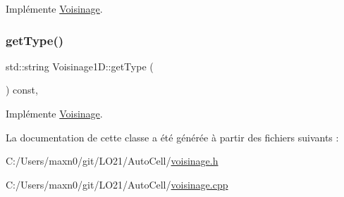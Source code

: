 Implémente \mbox{\hyperlink{class_voisinage_ac12f70bf8e971cbc8eaf8394de270d07}{Voisinage}}.

\mbox{\label{class_voisinage1_d_a92cc6dea76b6426d3cdaf849d18d205c}} 
\subsubsection{\texorpdfstring{get\+Type()}{getType()}}
{\footnotesize\ttfamily std\+::string Voisinage1\+D\+::get\+Type (\begin{DoxyParamCaption}{ }\end{DoxyParamCaption}) const\hspace{0.3cm}{\ttfamily [inline]}, {\ttfamily [virtual]}}



Implémente \mbox{\hyperlink{class_voisinage_a9853dfde1a68f5bb6333a8db001411a0}{Voisinage}}.



La documentation de cette classe a été générée à partir des fichiers suivants \+:\begin{DoxyCompactItemize}
\item 
C\+:/\+Users/maxn0/git/\+L\+O21/\+Auto\+Cell/\mbox{\hyperlink{voisinage_8h}{voisinage.\+h}}\item 
C\+:/\+Users/maxn0/git/\+L\+O21/\+Auto\+Cell/\mbox{\hyperlink{voisinage_8cpp}{voisinage.\+cpp}}\end{DoxyCompactItemize}

